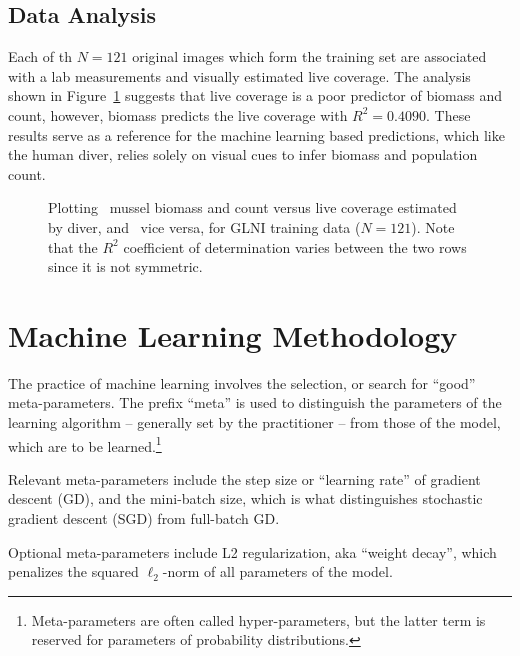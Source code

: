 \documentclass[11pt]{article} %
\begin{document}
\subsection{Data Analysis}

Each of th $N=121$ original images which form the training set are
associated with a lab measurements and visually estimated live coverage. 
The analysis shown in Figure~\ref{fig:data-analysis} suggests that live
coverage is a poor predictor of biomass and count, however, biomass predicts 
the live coverage with $R^2 = 0.4090$. These results serve as a reference for 
the machine learning based predictions, which like the human diver, relies 
solely on visual cues to infer biomass and population count.

\begin{figure}
\centering
{}
\caption{Plotting~ mussel biomass and count versus 
live coverage estimated by diver, and~ vice versa, 
for GLNI training data ($N=121$). Note that the $R^2$ coefficient of 
determination varies between the two rows since it is not symmetric.}
\label{fig:data-analysis}
\end{figure}



\section{Machine Learning Methodology}

The practice of machine learning involves the selection, or search for ``good'' 
meta-parameters. The prefix ``meta'' is used to distinguish the parameters of
the learning algorithm -- generally set by the practitioner -- from those of the
model, which are to be learned.\footnote{Meta-parameters are often called
hyper-parameters, but the latter term is reserved for parameters of 
probability distributions.}

Relevant meta-parameters include the step size or ``learning rate'' of gradient
descent (GD), and the mini-batch size, which is what distinguishes stochastic
gradient descent (SGD) from full-batch GD. 

Optional meta-parameters include L2 regularization, aka ``weight decay'',
which penalizes the squared $\ell_2$-norm of all parameters of the model.
\end{document}
